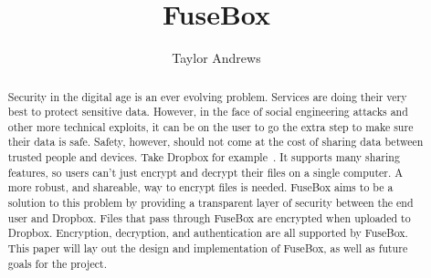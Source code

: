 \documentclass[11pt,twocolumn,letterpaper]{article}
\newcommand{\appname}{FuseBox }
\newcommand{\appnameWOspace}{FuseBox}
\begin{document}
\title{\appname}

\author{Taylor Andrews}

\maketitle

\begin{abstract}
Security in the digital age is an ever evolving problem.
Services are doing their very best to protect sensitive data. 
However, in the face of social engineering attacks and other more technical
exploits, it can be on the user to go the extra step to make sure
their data is safe. Safety, however, should not come at the cost of
sharing data between trusted people and devices. Take Dropbox for
example~\cite{dropbox}. It supports many sharing features, so users can't just
encrypt and decrypt their files on a single computer. A more robust,
and shareable, way to encrypt files is needed. 
\appname aims to be a solution to this problem by providing a
transparent layer of security between the end user and Dropbox. Files
that pass through \appname are encrypted when uploaded to Dropbox. 
Encryption, decryption, and authentication are all supported by \appnameWOspace.
This paper will lay out
the design and implementation of \appnameWOspace, as well as 
future goals for the project.    
\end{abstract}
\end{document}
